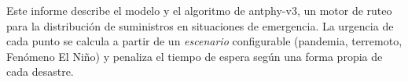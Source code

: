 Este informe describe el modelo y el algoritmo de antphy-v3, un motor de ruteo para la
distribución de suministros en situaciones de emergencia. La urgencia de cada punto se
calcula a partir de un \emph{escenario} configurable (pandemia, terremoto, Fenómeno El Niño)
y penaliza el tiempo de espera según una forma propia de cada desastre. 
